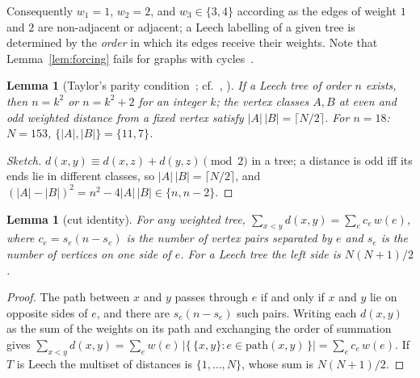 \documentclass[11pt,a4paper]{article}
\theoremstyle{plain}
\newtheorem{lemma}[theorem]{Lemma}
\theoremstyle{remark}
\begin{document}
Consequently $w_1=1$, $w_2=2$, and $w_3\in\{3,4\}$ according as the edges of
weight $1$ and $2$ are non-adjacent or adjacent; a Leech labelling of a given
tree is determined by the \emph{order} in which its edges receive their weights.
Note that Lemma~\ref{lem:forcing} fails for graphs with cycles~\cite{Calhoun2007}.

\begin{lemma}[Taylor's parity condition~\cite{Taylor1977}; cf.\ {\cite[Thm.~1]{SzekelyWangZhang2005}}, {\cite[Thm.~1.3]{Calhoun2007}}]\label{lem:taylor}
If a Leech tree of order $n$ exists, then $n=k^2$ or $n=k^2+2$ for an integer
$k$; the vertex classes $A,B$ at even and odd weighted distance from a fixed
vertex satisfy $|A|\,|B|=\lceil N/2\rceil$.  For $n=18$: $N=153$,
$\{|A|,|B|\}=\{11,7\}$.
\end{lemma}

\begin{proof}[Sketch]
$d(x,y)\equiv d(x,z)+d(y,z)\pmod 2$ in a tree; a distance is odd iff its ends lie
in different classes, so $|A|\,|B|=\lceil N/2\rceil$, and
$(|A|-|B|)^2=n^2-4|A|\,|B|\in\{n,n-2\}$.
\end{proof}

\begin{lemma}[cut identity]\label{lem:cut}
For any weighted tree, $\sum_{x<y}d(x,y)=\sum_e c_e\,w(e)$, where
$c_e=s_e(n-s_e)$ is the number of vertex pairs separated by $e$ and $s_e$ is the
number of vertices on one side of $e$.  For a Leech tree the left side is
$N(N+1)/2$.
\end{lemma}

\begin{proof}
The path between $x$ and $y$ passes through $e$ if and only if $x$ and $y$ lie
on opposite sides of $e$, and there are $s_e(n-s_e)$ such pairs.  Writing each
$d(x,y)$ as the sum of the weights on its path and exchanging the order of
summation gives
$\sum_{x<y}d(x,y)=\sum_e w(e)\,|\{\,\{x,y\}: e\in \text{path}(x,y)\,\}|
=\sum_e c_e\,w(e)$.
If $T$ is Leech the multiset of distances is $\{1,\dots,N\}$, whose sum is
$N(N+1)/2$.
\end{proof}
\end{document}
